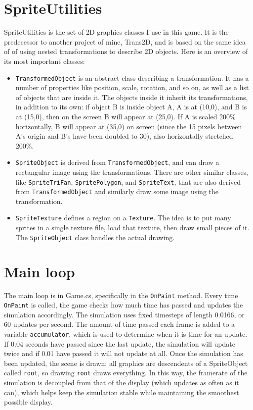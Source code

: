 \documentclass [12pt]{article}
\begin{document}
\section{SpriteUtilities}
SpriteUtilities is the set of 2D graphics classes I use in this game. It is the predecessor to another project of mine, Trans2D, and is based on the same idea of of using nested transformations to describe 2D objects. Here is an overview of its most important classes:
\begin{itemize}
	\item \texttt{TransformedObject} is an abstract class describing a transformation. It has a number of properties like position, scale, rotation, and so on, as well as a list of objects that are inside it. The objects inside it inherit its transformations, in addition to its own: if object B is inside object A, A is at (10,0), and B is at (15,0), then on the screen B will appear at (25,0). If A is scaled 200\% horizontally, B will appear at (35,0) on screen (since the 15 pixels between A's origin and B's have been doubled to 30), also horizontally stretched 200\%.
	\item \texttt{SpriteObject} is derived from \texttt{TransformedObject}, and can draw a rectangular image using the transformations. There are other similar classes, like \texttt{SpriteTriFan}, \texttt{SpritePolygon}, and \texttt{SpriteText}, that are also derived from \texttt{TransformedObject} and similarly draw some image using the transformation.
	\item \texttt{SpriteTexture} defines a region on a \texttt{Texture}. The idea is to put many sprites in a single texture file, load that texture, then draw small pieces of it. The \texttt{SpriteObject} class handles the actual drawing.
\end{itemize}
\section{Main loop}
The main loop is in Game.cs, specifically in the \texttt{OnPaint} method. Every time \texttt{OnPaint} is called, the game checks how much time has passed and updates the simulation accordingly. The simulation uses fixed timesteps of length 0.0166, or 60 updates per second. The amount of time passed each frame is added to a variable \texttt{accumulator}, which is used to determine when it is time for an update.  If 0.04 seconds have passed since the last update, the simulation will update twice and if 0.01 have passed it will not update at all. Once the simulation has been updated, the scene is drawn: all graphics are descendents of a SpriteObject called \texttt{root}, so drawing \texttt{root} draws everything. In this way, the framerate of the simulation is decoupled from that of the display (which updates as often as it can), which helps keep the simulation stable while maintaining the smoothest possible display.
\end{document}

